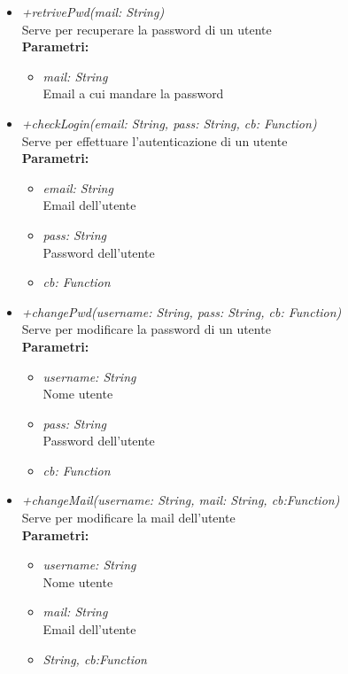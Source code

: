 \begin{itemize}
\begin{itemize}
\begin{itemize}
    		\end{itemize}
    		\item \emph{+retrivePwd(mail: String)}\\
    		Serve per recuperare la password di un utente\\
    		\textbf{Parametri:}
    		\begin{itemize}
    			\item \emph{mail: String}\\
    			Email a cui mandare la password
    		\end{itemize}
    		\item \emph{+checkLogin(email: String, pass: String, cb: Function)}\\
    		Serve per effettuare l'autenticazione di un utente\\
    		\textbf{Parametri:}
    		\begin{itemize}
    			\item \emph{email: String}\\
    			Email dell'utente
    			\item \emph{pass: String}\\
    			Password dell'utente
    			\item \emph{cb: Function}\\
    			
    		\end{itemize}
    		\item \emph{+changePwd(username: String, pass: String, cb: Function)}\\
    		Serve per modificare la password di un utente\\
    		\textbf{Parametri:}
    		\begin{itemize}
    			\item \emph{username: String}\\
    			Nome utente
    			\item \emph{pass: String}\\
    			Password dell'utente
    			\item \emph{cb: Function}\\
    			
    		\end{itemize}
    		\item \emph{+changeMail(username: String, mail: String, cb:Function)}\\
    		Serve per modificare la mail dell'utente\\
    		\textbf{Parametri:}
    		\begin{itemize}
    			\item \emph{username: String}\\
    			Nome utente
    			\item \emph{mail: String}\\
    			Email dell'utente
    			\item \emph{String, cb:Function}\\
    			

\end{itemize}
\end{itemize}
\end{itemize}

